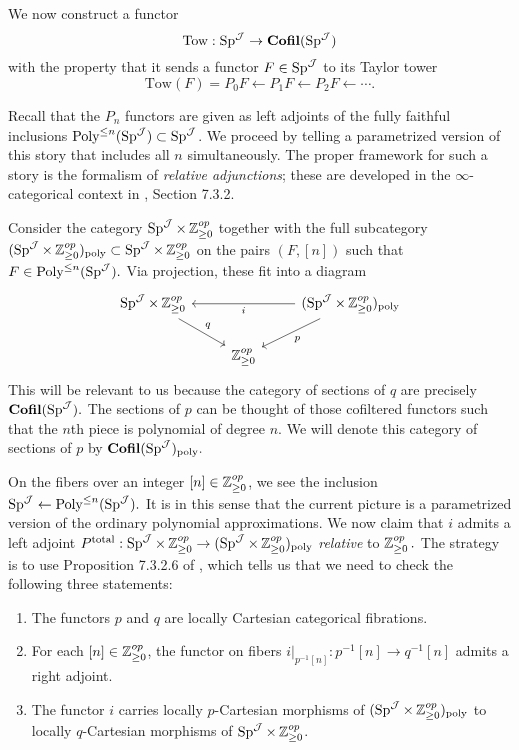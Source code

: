 
\begin{cnstr}\label{cnstr:tower}
We now construct a functor $$\text{Tow}: \operatorname{\mathrm{Sp}}^{\operatorname{\mathcal{J}}} \to \operatorname{\mathbf{Cofil}}(\operatorname{\mathrm{Sp}}^{\operatorname{\mathcal{J}}})$$ with the property that it sends a functor $F\in \operatorname{\mathrm{Sp}}^{\operatorname{\mathcal{J}}}$ to its Taylor tower $$\text{Tow}(F) = P_0F \longleftarrow P_1F \longleftarrow P_2F \longleftarrow \cdots.$$


Recall that the $P_n$ functors are given as left adjoints of the fully faithful inclusions $\operatorname{\text{Poly}}^{\leq n}(\operatorname{\mathrm{Sp}}^{\operatorname{\mathcal{J}}}) \subset \operatorname{\mathrm{Sp}}^{\operatorname{\mathcal{J}}}$.  We proceed by telling a parametrized version of this story that includes all $n$ simultaneously.  The proper framework for such a story is the formalism of \emph{relative adjunctions}; these are developed in the $\infty$-categorical context in \cite{HA}, Section 7.3.2.  

Consider the category $\operatorname{\mathrm{Sp}}^{\operatorname{\mathcal{J}}}\times \operatorname{\mathbb{Z}}^{op}_{\geq 0}$ together with the full subcategory $(\operatorname{\mathrm{Sp}}^{\operatorname{\mathcal{J}}}\times \operatorname{\mathbb{Z}}^{op}_{\geq 0})_{\text{poly}} \subset \operatorname{\mathrm{Sp}}^{\operatorname{\mathcal{J}}}\times \operatorname{\mathbb{Z}}^{op}_{\geq 0}$ on the pairs $(F, [n])$ such that $F\in \operatorname{\text{Poly}}^{\leq n}(\operatorname{\mathrm{Sp}}^{\operatorname{\mathcal{J}}}).$  Via projection, these fit into a diagram
$$
\begin{tikzcd}\label{dia:reladj}
\Sp^{\J}\times \Z^{op}_{\geq 0} \arrow[rd,"q"]& &(\Sp^{\J}\times \Z^{op}_{\geq 0})_{\text{poly}} \arrow[ld,"p"]\arrow[ll,"i"]  \\
& \Z^{op}_{\geq 0}
\end{tikzcd}
$$
 This will be relevant to us because the category of sections of $q$ are precisely $\operatorname{\mathbf{Cofil}}(\operatorname{\mathrm{Sp}}^{\operatorname{\mathcal{J}}}).$  The sections of $p$ can be thought of those cofiltered functors such that the $n$th piece is polynomial of degree $n$.  We will denote this category of sections of $p$ by $\operatorname{\mathbf{Cofil}}(\operatorname{\mathrm{Sp}}^{\operatorname{\mathcal{J}}})_{\text{poly}}.$ 

On the fibers over an integer $[n] \in \operatorname{\mathbb{Z}}^{op}_{\geq 0}$, we see the inclusion $\operatorname{\mathrm{Sp}}^{\operatorname{\mathcal{J}}} \leftarrow \operatorname{\text{Poly}}^{\leq n}(\operatorname{\mathrm{Sp}}^{\operatorname{\mathcal{J}}}).$  It is in this sense that the current picture is a parametrized version of the ordinary polynomial approximations.  We now claim that $i$ admits a left adjoint $P^{\text{total}}: \operatorname{\mathrm{Sp}}^{\operatorname{\mathcal{J}}}\times \operatorname{\mathbb{Z}}^{op}_{\geq 0} \to (\operatorname{\mathrm{Sp}}^{\operatorname{\mathcal{J}}}\times \operatorname{\mathbb{Z}}^{op}_{\geq 0})_{\text{poly}}$ \emph{relative} to $\operatorname{\mathbb{Z}}^{op}_{\geq 0}.$    The strategy is to use Proposition 7.3.2.6 of \cite{HA}, which tells us that we need to check the following three statements:
\begin{enumerate}
\item The functors $p$ and $q$ are locally Cartesian categorical fibrations.
\item For each $[n]\in \operatorname{\mathbb{Z}}^{op}_{\geq 0}$, the functor on fibers $i|_{p^{-1}[n]}:p^{-1}[n] \to q^{-1}[n]$ admits a right adjoint.  
\item The functor $i$ carries locally $p$-Cartesian morphisms of $(\operatorname{\mathrm{Sp}}^{\operatorname{\mathcal{J}}}\times \operatorname{\mathbb{Z}}^{op}_{\geq 0})_{\text{poly}}$ to locally $q$-Cartesian morphisms of $\operatorname{\mathrm{Sp}}^{\operatorname{\mathcal{J}}}\times \operatorname{\mathbb{Z}}^{op}_{\geq 0}$.
\end{enumerate}


\end{cnstr}
